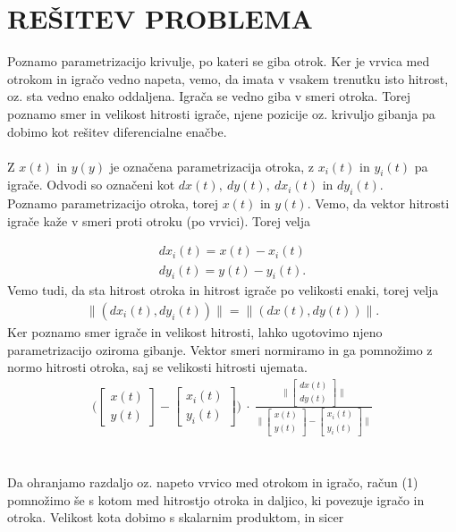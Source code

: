 \documentclass[a4paper,12pt]{article}
\begin{document}
\newpage
\section{\textsc{\large{REŠITEV PROBLEMA}}}

Poznamo parametrizacijo krivulje, po kateri se giba otrok. Ker je vrvica med otrokom in 
igračo vedno napeta, vemo, da imata v vsakem trenutku isto hitrost, oz. sta vedno enako 
oddaljena. Igrača se vedno giba v smeri otroka. 
Torej poznamo smer in velikost hitrosti igrače, njene pozicije oz. krivuljo gibanja pa 
dobimo kot rešitev diferencialne enačbe.
\\
\\
Z $x(t)$ in $y(y)$ je označena parametrizacija otroka, z $x_i(t)$ in $y_i(t)$ pa igrače. Odvodi so označeni kot $dx(t), \ dy(t), \ dx_i(t)$ in $dy_i(t)$. \\
Poznamo parametrizacijo otroka, torej $x(t)$ in $y(t)$. Vemo, da vektor hitrosti igrače kaže v smeri proti otroku (po vrvici).
Torej velja

\begin{align*}
    dx_i(t) = x(t) - x_i(t) \\
    dy_i(t) = y(t) - y_i(t).
\end{align*}
Vemo tudi, da sta hitrost otroka in hitrost igrače po velikosti enaki, torej velja
\begin{align*}
    \|(dx_i(t), dy_i(t))\| = \|(dx(t), dy(t))\|.
\end{align*}
Ker poznamo smer igrače in velikost hitrosti, lahko ugotovimo njeno parametrizacijo oziroma gibanje.
Vektor smeri normiramo in ga pomnožimo z normo hitrosti otroka, saj se velikosti hitrosti ujemata.
\\
\begin{align}
     \Big(
    \begin{bmatrix} 
        x(t) \\
        y(t)
    \end{bmatrix}
    -
    \begin{bmatrix} 
        x_i(t) \\
        y_i(t) 
    \end{bmatrix}
    \Big)
    \ \cdot \
    \frac{
    \Big \|
    \begin{bmatrix} 
        dx(t) \\
        dy(t)
    \end{bmatrix}
    \Big \|
    }
    {
    \Big \|
    \begin{bmatrix} 
        x(t) \\
        y(t)
    \end{bmatrix}
    -
    \begin{bmatrix} 
        x_i(t) \\
        y_i(t) 
    \end{bmatrix}
    \Big \|
    }
\end{align}
\\
\\
Da ohranjamo razdaljo oz. napeto vrvico med otrokom in igračo, račun (1) pomnožimo še 
s kotom med hitrostjo otroka in daljico, ki povezuje igračo in otroka. 
Velikost kota dobimo s skalarnim produktom, in sicer
\end{document}
